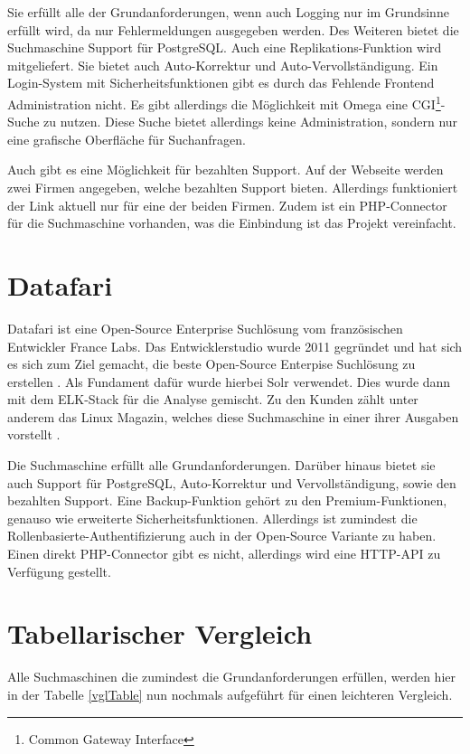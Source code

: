 Sie erfüllt alle der Grundanforderungen, wenn auch Logging nur im Grundsinne erfüllt wird, da nur Fehlermeldungen ausgegeben werden. Des Weiteren bietet die Suchmaschine Support für PostgreSQL. Auch eine Replikations-Funktion wird mitgeliefert. Sie bietet auch Auto-Korrektur und Auto-Vervollständigung. Ein Login-System mit Sicherheitsfunktionen gibt es durch das Fehlende Frontend Administration nicht. Es gibt allerdings die Möglichkeit mit Omega eine CGI\footnote{Common Gateway Interface}-Suche zu nutzen. Diese Suche bietet allerdings keine Administration, sondern nur eine grafische Oberfläche für Suchanfragen.

Auch gibt es eine Möglichkeit für bezahlten Support. Auf der Webseite werden zwei Firmen angegeben, welche bezahlten Support bieten. Allerdings funktioniert der Link aktuell nur für eine der beiden Firmen. Zudem ist ein PHP-Connector für die Suchmaschine vorhanden, was die Einbindung ist das Projekt vereinfacht. \cite{XAP.2019}

\section{Datafari}
\label{datafari}

Datafari ist eine Open-Source Enterprise Suchlösung vom französischen Entwickler France Labs. Das Entwicklerstudio wurde 2011 gegründet und hat sich es sich zum Ziel gemacht, die beste Open-Source Enterpise Suchlösung zu erstellen \cite{Labs.2019}. Als Fundament dafür wurde hierbei Solr verwendet. Dies wurde dann mit dem ELK-Stack für die Analyse gemischt. Zu den Kunden zählt unter anderem das Linux Magazin, welches diese Suchmaschine in einer ihrer Ausgaben vorstellt \cite{MichaelBrandenburg.2019}. 

Die Suchmaschine erfüllt alle Grundanforderungen. Darüber hinaus bietet sie auch Support für PostgreSQL, Auto-Korrektur und Vervollständigung, sowie den bezahlten Support. Eine Backup-Funktion gehört zu den Premium-Funktionen, genauso wie erweiterte Sicherheitsfunktionen. Allerdings ist zumindest die Rollenbasierte-Authentifizierung auch in der Open-Source Variante zu haben. Einen direkt PHP-Connector gibt es nicht, allerdings wird eine HTTP-API zu Verfügung gestellt. \cite{Labs.b}

\section{Tabellarischer Vergleich}

Alle Suchmaschinen die zumindest die Grundanforderungen erfüllen, werden hier in der Tabelle \ref{vglTable} nun nochmals aufgeführt für einen leichteren Vergleich.

